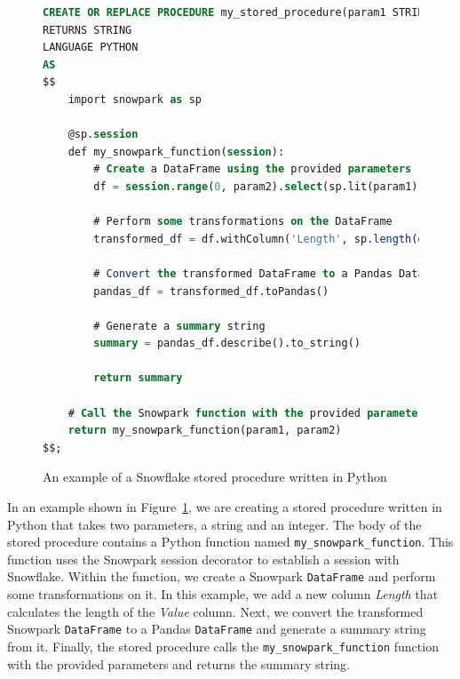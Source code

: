 \begin{figure}[ht]
\begin{lstlisting}[language=SQL]
CREATE OR REPLACE PROCEDURE my_stored_procedure(param1 STRING, param2 INT)
RETURNS STRING
LANGUAGE PYTHON
AS
$$
    import snowpark as sp

    @sp.session
    def my_snowpark_function(session):
        # Create a DataFrame using the provided parameters
        df = session.range(0, param2).select(sp.lit(param1).alias('Value'))
        
        # Perform some transformations on the DataFrame
        transformed_df = df.withColumn('Length', sp.length(df['Value']))
        
        # Convert the transformed DataFrame to a Pandas DataFrame
        pandas_df = transformed_df.toPandas()
        
        # Generate a summary string
        summary = pandas_df.describe().to_string()
        
        return summary
    
    # Call the Snowpark function with the provided parameters
    return my_snowpark_function(param1, param2)
$$;
\end{lstlisting}
\caption{An example of a Snowflake stored procedure written in Python}
\label{fig:snowflakeScript}
\end{figure}

\par
In an example shown in Figure~\ref{fig:snowflakeScript}, we are creating a stored procedure written in Python that takes two parameters, a string and an integer. The body of the stored procedure contains a Python function named \texttt{my\_snowpark\_function}. This function uses the Snowpark session decorator to establish a session with Snowflake. Within the function, we create a Snowpark \texttt{DataFrame} and perform some transformations on it. In this example, we add a new column \textit{Length} that calculates the length of the \textit{Value} column. Next, we convert the transformed Snowpark \texttt{DataFrame} to a Pandas \texttt{DataFrame} and generate a summary string from it. Finally, the stored procedure calls the \texttt{my\_snowpark\_function} function with the provided parameters and returns the summary string.

